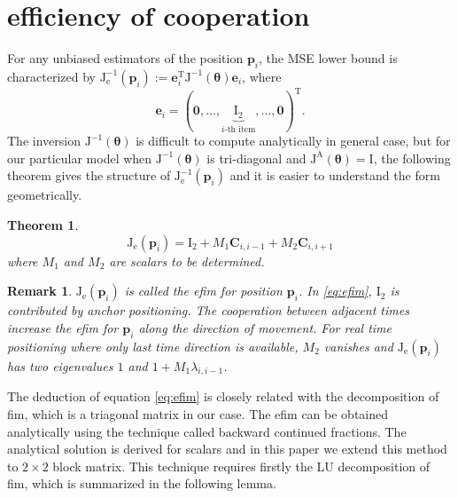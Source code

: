\documentclass[conference]{IEEEtran}
\newtheorem{theorem}{Theorem}
\newtheorem{remark}{Remark}
\begin{document}
\section{efficiency of cooperation}\label{efficiency}
For any unbiased estimators of the position $\bm{p}_i$, the MSE lower bound is characterized by $\bm{\mathrm{J}}^{-1}_{\mathrm{e}}(\bm{p}_i):=\bm{e}_i^{\textrm{T}}\bm{\mathrm{J}}^{-1}(\bm{\theta})\bm{e}_i$, where
\begin{equation}
\bm{e}_i=(\bm{0},\dots,\underbrace{\bm{\mathrm{I}}_2}_{\text{$i$-th item}},\dots,\bm{0})^{\textrm{T}}.
\end{equation}
The inversion $\bm{\mathrm{J}}^{-1}(\bm{\theta})$ is difficult to compute analytically in general case, but for our particular model when $\bm{\mathrm{J}}^{-1}(\bm{\theta})$ is tri-diagonal and $\bm{\mathrm{J}}^\mathrm{A}(\bm{\theta})= \bm{\mathrm{I}}$, the following theorem gives the structure of $\bm{\mathrm{J}}^{-1}_{\mathrm{e}}(\bm{p}_i)$ and it is easier to understand the form geometrically.
\begin{theorem}
\begin{equation}\label{eq:efim}
\bm{\mathrm{J}}_{\mathrm{e}}(\bm{p}_i)=\bm{\mathrm{I}}_2+M_1 \bm{C}_{i,i-1} +M_2 \bm{C}_{i,i+1}
\end{equation}
where $M_1$ and $M_2$ are scalars to be determined.
\end{theorem}
\begin{remark}
$\bm{\mathrm{J}}_{\mathrm{e}}(\bm{p}_i)$ is called the \ac{efim} for position $\bm{p}_i$\cite{LimitBound2}.
In \eqref{eq:efim}, $\bm{\mathrm{I}}_2$ is contributed by anchor positioning. 
The cooperation between adjacent times increase the \ac{efim} for $\bm{p}_i$ along the direction of movement. For real time positioning where only last time direction is available, $M_2$ vanishes and $\bm{\mathrm{J}}_{\mathrm{e}}(\bm{p}_i)$ 
has two eigenvalues $1$ and $1+M_1\lambda_{i,i-1}$.
\end{remark}
The deduction of equation \eqref{eq:efim} is closely related with the decomposition of \ac{fim}, which is a triagonal matrix in our case. 
The \ac{efim} can be obtained analytically using the technique called backward continued fractions\cite{K2008Explicit}. 
The analytical solution is derived for scalars and in this paper we extend this method to $2\times 2$ block matrix. 
This technique requires firstly the LU decomposition of \ac{fim}, which is summarized in the following lemma.
\end{document}
